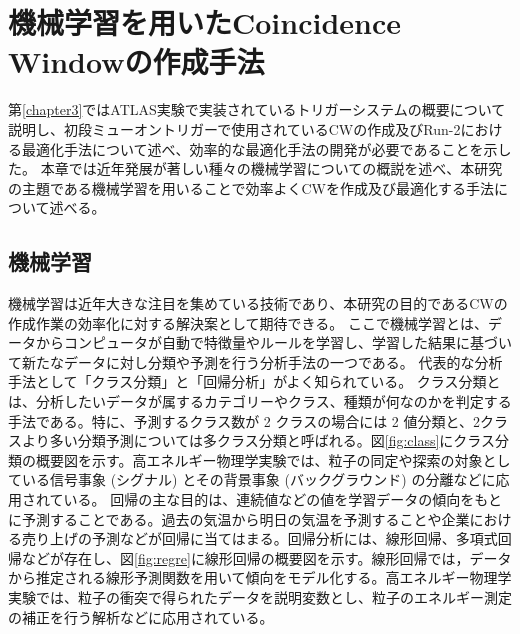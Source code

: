 \chapter{機械学習を用いたCoincidence Windowの作成手法}\label{chapter4}
第\ref{chapter3}ではATLAS実験で実装されているトリガーシステムの概要について説明し、初段ミューオントリガーで使用されているCWの作成及びRun-2における最適化手法について述べ、効率的な最適化手法の開発が必要であることを示した。
本章では近年発展が著しい種々の機械学習についての概説を述べ、本研究の主題である機械学習を用いることで効率よくCWを作成及び最適化する手法について述べる。

\section{機械学習}\label{回帰分析}
機械学習は近年大きな注目を集めている技術であり、本研究の目的であるCWの作成作業の効率化に対する解決案として期待できる。
ここで機械学習とは、データからコンピュータが自動で特徴量やルールを学習し、学習した結果に基づいて新たなデータに対し分類や予測を行う分析手法の一つである。
代表的な分析手法として「クラス分類」と「回帰分析」がよく知られている。
クラス分類とは、分析したいデータが属するカテゴリーやクラス、種類が何なのかを判定する手法である。特に、予測するクラス数が 2 クラスの場合には 2 値分類と、2クラスより多い分類予測については多クラス分類と呼ばれる。図\ref{fig:class}にクラス分類の概要図を示す。高エネルギー物理学実験では、粒子の同定や探索の対象としている信号事象 (シグナル) とその背景事象 (バックグラウンド) の分離などに応用されている。
回帰の主な目的は、連続値などの値を学習データの傾向をもとに予測することである。過去の気温から明日の気温を予測することや企業における売り上げの予測などが回帰に当てはまる。回帰分析には、線形回帰、多項式回帰などが存在し、図\ref{fig:regre}に線形回帰の概要図を示す。線形回帰では，データから推定される線形予測関数を用いて傾向をモデル化する。高エネルギー物理学実験では、粒子の衝突で得られたデータを説明変数とし、粒子のエネルギー測定の補正を行う解析などに応用されている。

